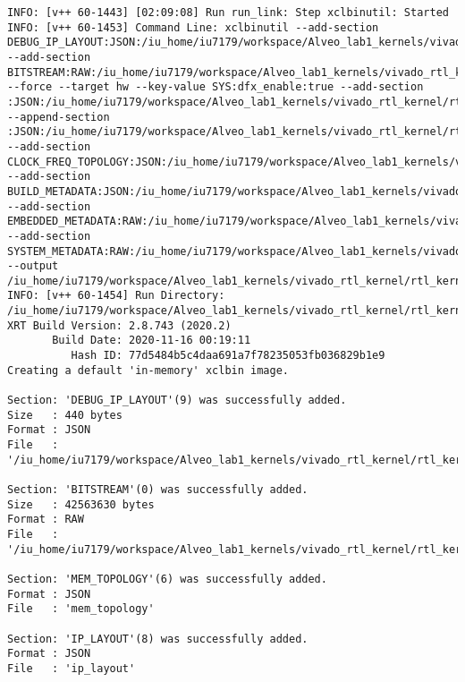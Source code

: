 \begin{lstlisting}[label=func,breaklines=true,breakatwhitespace=false,caption=СОДЕРЖИМОЕ LOG-ФАЙЛА.]
INFO: [v++ 60-1443] [02:09:08] Run run_link: Step xclbinutil: Started
INFO: [v++ 60-1453] Command Line: xclbinutil --add-section DEBUG_IP_LAYOUT:JSON:/iu_home/iu7179/workspace/Alveo_lab1_kernels/vivado_rtl_kernel/rtl_kernel_wizard_0_ex/exports/_x/link/int/debug_ip_layout.rtd --add-section BITSTREAM:RAW:/iu_home/iu7179/workspace/Alveo_lab1_kernels/vivado_rtl_kernel/rtl_kernel_wizard_0_ex/exports/_x/link/int/partial.bit --force --target hw --key-value SYS:dfx_enable:true --add-section :JSON:/iu_home/iu7179/workspace/Alveo_lab1_kernels/vivado_rtl_kernel/rtl_kernel_wizard_0_ex/exports/_x/link/int/vinc.rtd --append-section :JSON:/iu_home/iu7179/workspace/Alveo_lab1_kernels/vivado_rtl_kernel/rtl_kernel_wizard_0_ex/exports/_x/link/int/appendSection.rtd --add-section CLOCK_FREQ_TOPOLOGY:JSON:/iu_home/iu7179/workspace/Alveo_lab1_kernels/vivado_rtl_kernel/rtl_kernel_wizard_0_ex/exports/_x/link/int/vinc_xml.rtd --add-section BUILD_METADATA:JSON:/iu_home/iu7179/workspace/Alveo_lab1_kernels/vivado_rtl_kernel/rtl_kernel_wizard_0_ex/exports/_x/link/int/vinc_build.rtd --add-section EMBEDDED_METADATA:RAW:/iu_home/iu7179/workspace/Alveo_lab1_kernels/vivado_rtl_kernel/rtl_kernel_wizard_0_ex/exports/_x/link/int/vinc.xml --add-section SYSTEM_METADATA:RAW:/iu_home/iu7179/workspace/Alveo_lab1_kernels/vivado_rtl_kernel/rtl_kernel_wizard_0_ex/exports/_x/link/int/systemDiagramModelSlrBaseAddress.json --output /iu_home/iu7179/workspace/Alveo_lab1_kernels/vivado_rtl_kernel/rtl_kernel_wizard_0_ex/exports/vinc.xclbin
INFO: [v++ 60-1454] Run Directory: /iu_home/iu7179/workspace/Alveo_lab1_kernels/vivado_rtl_kernel/rtl_kernel_wizard_0_ex/exports/_x/link/run_link
XRT Build Version: 2.8.743 (2020.2)
       Build Date: 2020-11-16 00:19:11
          Hash ID: 77d5484b5c4daa691a7f78235053fb036829b1e9
Creating a default 'in-memory' xclbin image.

Section: 'DEBUG_IP_LAYOUT'(9) was successfully added.
Size   : 440 bytes
Format : JSON
File   : '/iu_home/iu7179/workspace/Alveo_lab1_kernels/vivado_rtl_kernel/rtl_kernel_wizard_0_ex/exports/_x/link/int/debug_ip_layout.rtd'

Section: 'BITSTREAM'(0) was successfully added.
Size   : 42563630 bytes
Format : RAW
File   : '/iu_home/iu7179/workspace/Alveo_lab1_kernels/vivado_rtl_kernel/rtl_kernel_wizard_0_ex/exports/_x/link/int/partial.bit'

Section: 'MEM_TOPOLOGY'(6) was successfully added.
Format : JSON
File   : 'mem_topology'

Section: 'IP_LAYOUT'(8) was successfully added.
Format : JSON
File   : 'ip_layout'


\end{lstlisting}
